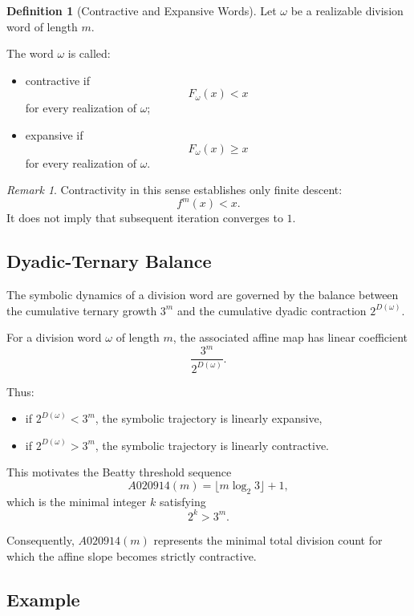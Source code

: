 \documentclass[12pt, oneside]{article}
\numberwithin{equation}{section}
\theoremstyle{definition}
\newtheorem{definition}{Definition}[section]
\theoremstyle{plain}
\theoremstyle{remark}
\newtheorem*{remark}{Remark}
\begin{document}
\begin{definition}[Contractive and Expansive Words]
Let $\omega$ be a realizable division word of length $m$.

The word $\omega$ is called:

\begin{itemize}
\item contractive if
\[
F_\omega(x) < x
\]
for every realization of $\omega$;

\item expansive if
\[
F_\omega(x) \ge x
\]
for every realization of $\omega$.
\end{itemize}
\end{definition}

\begin{remark}
Contractivity in this sense establishes only finite descent:
\[
f^m(x)<x.
\]
It does not imply that subsequent iteration converges to $1$.
\end{remark}

\subsection{Dyadic-Ternary Balance}

The symbolic dynamics of a division word are governed by the balance
between the cumulative ternary growth \(3^m\) and the cumulative dyadic
contraction \(2^{D(\omega)}\).

For a division word \(\omega\) of length \(m\), the associated affine map
has linear coefficient
\[
\frac{3^m}{2^{D(\omega)}}.
\]

Thus:
\begin{itemize}
\item if \(2^{D(\omega)} < 3^m\), the symbolic trajectory is linearly expansive,
\item if \(2^{D(\omega)} > 3^m\), the symbolic trajectory is linearly contractive.
\end{itemize}

This motivates the Beatty threshold sequence
\[
A020914(m)=\lfloor m\log_2 3\rfloor+1,
\]
which is the minimal integer \(k\) satisfying
\[
2^k>3^m.
\]

Consequently, \(A020914(m)\) represents the minimal total division count
for which the affine slope becomes strictly contractive.

\subsection{Example}
\end{document}
